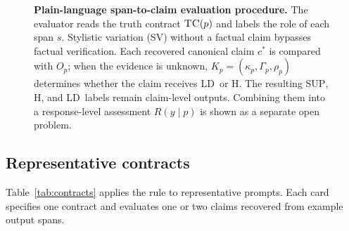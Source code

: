 \documentclass{clv2025}
\newcommand{\TC}{\textsc{TC}}
\newcommand{\LD}{\textsc{LD}}
\newcommand{\Hall}{\textsc{H}}
\newcommand{\SUP}{\textsc{SUP}}
\newcommand{\SV}{\textsc{SV}}
\begin{document}
\begin{figure}[t]
{}
\caption{\textbf{Plain-language span-to-claim evaluation procedure.}
The evaluator reads the truth contract $\TC(p)$ and labels the role of each span $s$.
Stylistic variation (\SV) without a factual claim bypasses factual verification.
Each recovered canonical claim $c^*$ is compared with $O_p$; when the evidence is unknown, $K_p=(\kappa_p,\Gamma_p,\rho_p)$ determines whether the claim receives \LD\ or \Hall.
The resulting \SUP, \Hall, and \LD\ labels remain claim-level outputs.
Combining them into a response-level assessment $R(y\mid p)$ is shown as a separate open problem.}
\label{fig:decision}
\end{figure}

\subsection{Representative contracts}

Table~\ref{tab:contracts} applies the rule to representative prompts.
Each card specifies one contract and evaluates one or two claims recovered from example output spans.
\end{document}

